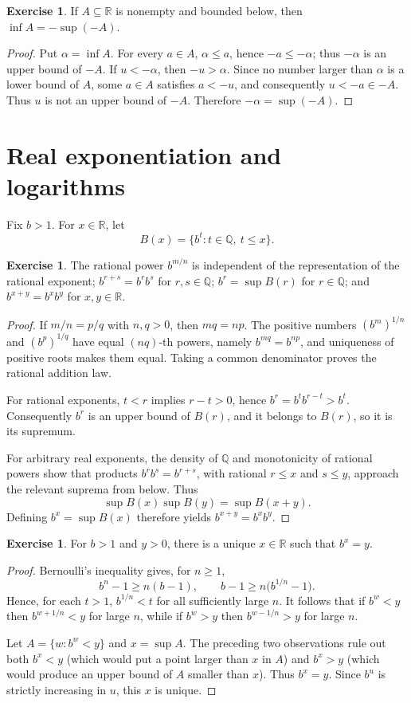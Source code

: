 \documentclass[12pt]{article}
\theoremstyle{definition}
\newtheorem{exercise}[theorem]{Exercise}
\newcommand{\R}{\mathbb R}
\newcommand{\Q}{\mathbb Q}
\begin{document}
\begin{exercise}
If $A\subseteq\R$ is nonempty and bounded below, then
$\inf A=-\sup(-A)$.
\end{exercise}
\begin{proof}
Put $\alpha=\inf A$.  For every $a\in A$, $\alpha\le a$, hence
$-a\le-\alpha$; thus $-\alpha$ is an upper bound of $-A$.  If
$u<-\alpha$, then $-u>\alpha$.  Since no number larger than $\alpha$ is
a lower bound of $A$, some $a\in A$ satisfies $a<-u$, and consequently
$u<-a\in-A$.  Thus $u$ is not an upper bound of $-A$.  Therefore
$-\alpha=\sup(-A)$.
\end{proof}

\section{Real exponentiation and logarithms}
Fix $b>1$.  For $x\in\R$, let
\[
 B(x)=\{b^t:t\in\Q,\ t\le x\}.
\]
\begin{exercise}
The rational power $b^{m/n}$ is independent of the representation of the
rational exponent; $b^{r+s}=b^rb^s$ for $r,s\in\Q$;
$b^r=\sup B(r)$ for $r\in\Q$; and $b^{x+y}=b^xb^y$ for $x,y\in\R$.
\end{exercise}
\begin{proof}
If $m/n=p/q$ with $n,q>0$, then $mq=np$.  The positive numbers
$(b^m)^{1/n}$ and $(b^p)^{1/q}$ have equal $(nq)$-th powers, namely
$b^{mq}=b^{np}$, and uniqueness of positive roots makes them equal.
Taking a common denominator proves the rational addition law.

For rational exponents, $t<r$ implies $r-t>0$, hence
$b^r=b^t b^{r-t}>b^t$.  Consequently $b^r$ is an upper bound of $B(r)$,
and it belongs to $B(r)$, so it is its supremum.

For arbitrary real exponents, the density of $\Q$ and monotonicity of
rational powers show that products $b^r b^s=b^{r+s}$, with rational
$r\le x$ and $s\le y$, approach the relevant suprema from below.  Thus
\[
 \sup B(x)\sup B(y)=\sup B(x+y).
\]
Defining $b^x=\sup B(x)$ therefore yields $b^{x+y}=b^xb^y$.
\end{proof}

\begin{exercise}
For $b>1$ and $y>0$, there is a unique $x\in\R$ such that $b^x=y$.
\end{exercise}
\begin{proof}
Bernoulli's inequality gives, for $n\ge1$,
\[
 b^n-1\ge n(b-1),\qquad
 b-1\ge n\bigl(b^{1/n}-1\bigr).
\]
Hence, for each $t>1$, $b^{1/n}<t$ for all sufficiently large $n$.
It follows that if $b^w<y$ then $b^{w+1/n}<y$ for large $n$, while if
$b^w>y$ then $b^{w-1/n}>y$ for large $n$.

Let $A=\{w:b^w<y\}$ and $x=\sup A$.  The preceding two observations
rule out both $b^x<y$ (which would put a point larger than $x$ in $A$)
and $b^x>y$ (which would produce an upper bound of $A$ smaller than
$x$).  Thus $b^x=y$.  Since $b^u$ is strictly increasing in $u$, this
$x$ is unique.
\end{proof}
\end{document}
